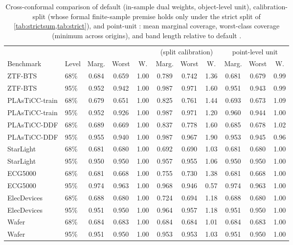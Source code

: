 \begin{table}[!htbp]
\centering
\caption{Cross-conformal comparison of default \gamut{} (in-sample dual weights, object-level unit), calibration-split \gamut{} (whose formal finite-sample premise holds only under the strict split of \cref{tab:strictsum,tab:strict}), and point-unit \gamut{}: mean marginal coverage, worst-class coverage (minimum across origins), and band length relative to default \gamut{}.}
\label{tab:cert}
\scriptsize
\begin{tabular}{llccc ccc ccc}
\toprule
 & & \multicolumn{3}{c}{\gamut{}} & \multicolumn{3}{c}{\gamut{} (split calibration)} & \multicolumn{3}{c}{point-level unit} \\
\cmidrule(lr){3-5}\cmidrule(lr){6-8}\cmidrule(lr){9-11}
Benchmark & Level & Marg. & Worst & W. & Marg. & Worst & W. & Marg. & Worst & W. \\
\midrule
ZTF-BTS & 68\% & 0.684 & 0.659 & 1.00 & 0.789 & 0.742 & 1.36 & 0.681 & 0.679 & 0.99 \\
ZTF-BTS & 95\% & 0.952 & 0.942 & 1.00 & 0.987 & 0.971 & 1.60 & 0.951 & 0.943 & 0.99 \\
PLAsTiCC-train & 68\% & 0.679 & 0.651 & 1.00 & 0.825 & 0.761 & 1.44 & 0.693 & 0.673 & 1.09 \\
PLAsTiCC-train & 95\% & 0.952 & 0.926 & 1.00 & 0.987 & 0.971 & 1.20 & 0.960 & 0.944 & 1.00 \\
PLAsTiCC-DDF & 68\% & 0.689 & 0.669 & 1.00 & 0.837 & 0.778 & 1.60 & 0.685 & 0.678 & 1.02 \\
PLAsTiCC-DDF & 95\% & 0.955 & 0.940 & 1.00 & 0.987 & 0.967 & 1.90 & 0.953 & 0.945 & 0.96 \\
StarLight & 68\% & 0.681 & 0.680 & 1.00 & 0.692 & 0.690 & 1.03 & 0.681 & 0.680 & 1.00 \\
StarLight & 95\% & 0.950 & 0.950 & 1.00 & 0.957 & 0.955 & 1.06 & 0.950 & 0.950 & 1.00 \\
ECG5000 & 68\% & 0.681 & 0.668 & 1.00 & 0.755 & 0.730 & 1.38 & 0.681 & 0.668 & 1.00 \\
ECG5000 & 95\% & 0.974 & 0.963 & 1.00 & 0.968 & 0.946 & 0.57 & 0.974 & 0.963 & 1.00 \\
ElecDevices & 68\% & 0.688 & 0.680 & 1.00 & 0.724 & 0.694 & 1.18 & 0.688 & 0.680 & 1.00 \\
ElecDevices & 95\% & 0.951 & 0.950 & 1.00 & 0.964 & 0.957 & 1.18 & 0.951 & 0.950 & 1.00 \\
Wafer & 68\% & 0.684 & 0.683 & 1.00 & 0.684 & 0.684 & 1.01 & 0.684 & 0.683 & 1.00 \\
Wafer & 95\% & 0.951 & 0.950 & 1.00 & 0.953 & 0.953 & 1.03 & 0.951 & 0.950 & 1.00 \\
\bottomrule
\end{tabular}
\end{table}
